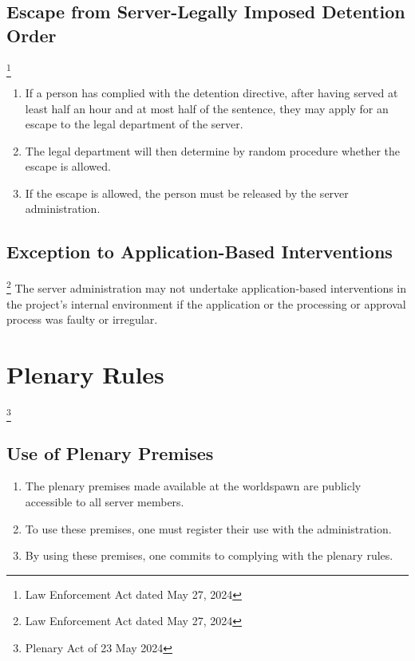 \documentclass{article}
\begin{document}
\subsection{Escape from Server-Legally Imposed Detention Order}\footnote{Law Enforcement Act dated May 27, 2024}
\begin{enumerate}[(1)]
	\item If a person has complied with the detention directive, after having served at least half an hour and at most half of the sentence, they may apply for an escape to the legal department of the server.
	\item The legal department will then determine by random procedure whether the escape is allowed.
	\item If the escape is allowed, the person must be released by the server administration.
\end{enumerate}

\subsection{Exception to Application-Based Interventions}\footnote{Law Enforcement Act dated May 27, 2024}
The server administration may not undertake application-based interventions in the project’s internal environment if the application or the processing or approval process was faulty or irregular.


\section{Plenary Rules}\footnote{Plenary Act of 23 May 2024}
\subsection{Use of Plenary Premises}
\begin{enumerate}[(1)]
	\item The plenary premises made available at the worldspawn are publicly accessible to all server members.
	\item To use these premises, one must register their use with the administration.
	\item By using these premises, one commits to complying with the plenary rules.
\end{enumerate}
\end{document}
